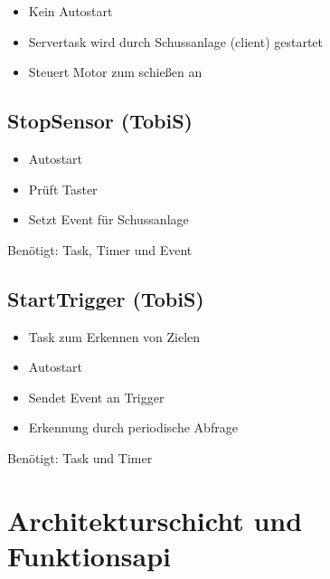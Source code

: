 \documentclass[a4paper,11pt]{scrreprt}
\begin{document}
\begin{itemize}
 \item Kein Autostart
 \item Servertask wird durch Schussanlage (client) gestartet
 \item Steuert Motor zum schießen an
\end{itemize}


\subsection*{StopSensor (TobiS)}

\begin{itemize}
 \item Autostart
 \item Prüft Taster
 \item Setzt Event für Schussanlage
\end{itemize}

Benötigt: Task, Timer und Event


\subsection*{StartTrigger (TobiS)}

\begin{itemize}
 \item Task zum Erkennen von Zielen
 \item Autostart
 \item Sendet Event an Trigger
 \item Erkennung durch periodische Abfrage
\end{itemize}

Benötigt: Task und Timer

\section{Architekturschicht und Funktionsapi}
\end{document}
